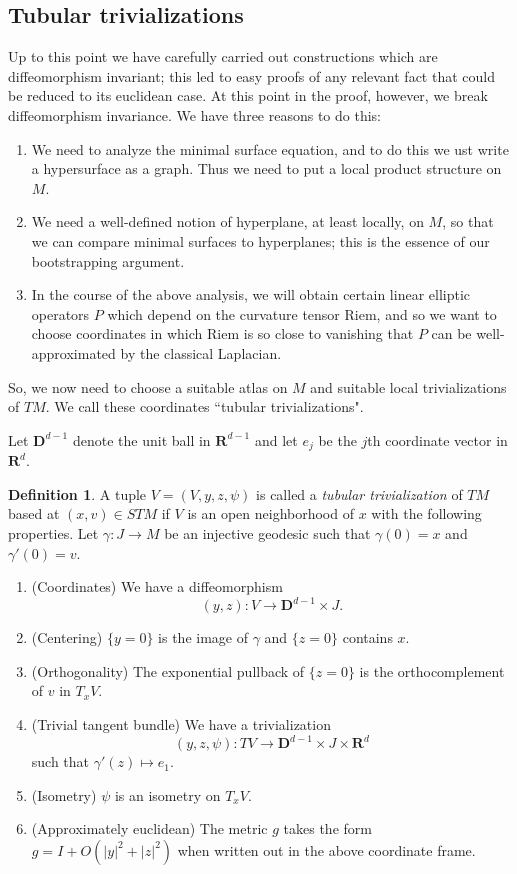 \documentclass[reqno,12pt,letterpaper]{amsart}
\newcommand{\RR}{\mathbf{R}}
\newcommand{\DD}{\mathbf{D}}
\newcommand{\Riem}{\mathrm{Riem}}
\newcommand{\dfn}[1]{\emph{#1}\index{#1}}
\theoremstyle{definition}
\newtheorem{definition}[theorem]{Definition}
\numberwithin{equation}{section}
\begin{document}
\subsection{Tubular trivializations}
Up to this point we have carefully carried out constructions which are diffeomorphism invariant; this led to easy proofs of any relevant fact that could be reduced to its euclidean case.
At this point in the proof, however, we break diffeomorphism invariance.
We have three reasons to do this:
\begin{enumerate}
\item We need to analyze the minimal surface equation, and to do this we ust write a hypersurface as a graph. Thus we need to put a local product structure on $M$.
\item We need a well-defined notion of hyperplane, at least locally, on $M$, so that we can compare minimal surfaces to hyperplanes; this is the essence of our bootstrapping argument.
\item In the course of the above analysis, we will obtain certain linear elliptic operators $P$ which depend on the curvature tensor $\Riem$, and so we want to choose coordinates in which $\Riem$ is so close to vanishing that $P$ can be well-approximated by the classical Laplacian.
\end{enumerate}
So, we now need to choose a suitable atlas on $M$ and suitable local trivializations of $TM$.
We call these coordinates ``tubular trivializations".

Let $\DD^{d - 1}$ denote the unit ball in $\RR^{d - 1}$ and let $e_j$ be the $j$th coordinate vector in $\RR^d$.

\begin{definition}
A tuple $V = (V, y, z, \psi)$ is called a \dfn{tubular trivialization} of $TM$ based at $(x, v) \in STM$ if $V$ is an open neighborhood of $x$ with the following properties.
Let $\gamma: J \to M$ be an injective geodesic such that $\gamma(0) = x$ and $\gamma'(0) = v$.
\begin{enumerate}
\item (Coordinates) We have a diffeomorphism
$$(y, z): V \to \DD^{d - 1} \times J.$$
\item (Centering) $\{y = 0\}$ is the image of $\gamma$ and $\{z = 0\}$ contains $x$.
\item (Orthogonality) The exponential pullback of $\{z = 0\}$ is the orthocomplement of $v$ in $T_x V$.
\item (Trivial tangent bundle) We have a trivialization
$$(y, z, \psi): TV \to \DD^{d - 1} \times J \times \RR^d$$
such that $\gamma'(z) \mapsto e_1$.
\item (Isometry) $\psi$ is an isometry on $T_xV$.
\item (Approximately euclidean) The metric $g$ takes the form $g = I + O(|y|^2 + |z|^2)$ when written out in the above coordinate frame.
\end{enumerate}
\end{definition}
\end{document}
